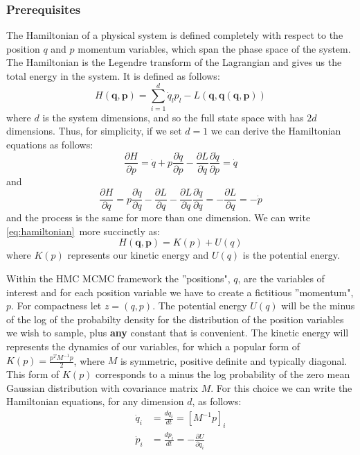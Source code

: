 \documentclass[]{report}
\begin{document}
\subsubsection{Prerequisites}
The Hamiltonian of a physical system is defined completely with respect to the position $q$ and $p$ momentum variables, which span the phase space of the system. The Hamiltonian is the Legendre transform of the Lagrangian and gives us the total energy in the system. It is defined as follows: 
\begin{equation}
\label{eq:hamiltonian}
 H(\textbf{q},\textbf{p}) = \sum_{i = 1}^{d}\dot{q}_{l}p_{l} - L(\textbf{q}, \textbf{\.{q}}(\textbf{q}, \textbf{p}))
\end{equation}
where $d$ is the system dimensions, and so the full state space with has $2d$ dimensions.  
Thus, for simplicity, if we set $d = 1$ we can derive the Hamiltonian equations as follows:\begin{equation}
\label{eq:hameq1}
\frac{\partial H}{\partial p} = \dot{q} + p\frac{\partial \dot{q}}{\partial p} - \frac{\partial L}{\partial \dot{q}}\frac{\partial \dot{q}}{\partial p} = \dot{q} \end{equation}
and 
\begin{equation}
\label{eq:hameq2}
\frac{\partial H}{\partial q} = p\frac{\partial \dot{q}}{\partial q} - \frac{\partial L}{\partial q} - \frac{\partial L}{\partial \dot{q}}\frac{\partial \dot{q}}{\partial q} = - \frac{\partial L}{\partial q}= -\dot{p}  \end{equation}
and the process is the same for more than one dimension. 
We can write \ref{eq:hamiltonian}\ more succinctly as:
\begin{equation}
\label{eq:hamreduced}
H(\textbf{q}, \textbf{p})  = K(p) + U(q)
\end{equation}
where $K(p)$ represents our kinetic energy and $U(q)$ is the potential energy.

Within the HMC MCMC framework the ''positions", $q$, are the variables of interest and for each position variable we have to create a fictitious ''momentum", $p$. For compactness let $z = (q,p)$. The potential energy $U(q)$ will be the minus of the log of the probabilty density for the distribution of the position variables we wish to sample, plus \textbf{any} constant that is convenient.  The kinetic energy will represents the dynamics of our variables, for which a popular form of $K(p) = \frac{p^{T} M^{-1} p}{2}$, where $M$ is symmetric, positive definite and typically diagonal. This form of $K(p)$ corresponds to a minus the log probability of the zero mean Gaussian distribution with covariance matrix $M$. For this choice we can write the Hamiltonian equations, for any dimension $d$, as follows:
\begin{align}
\dot{q}_{i} &= \frac{dq_{i}}{dt} = [M^{-1}p]_{i} \\
\dot{p}_{i} &= \frac{dp_{i}}{dt} = -\frac{\partial U}{\partial q_{i}}
\end{align}
\end{document}
